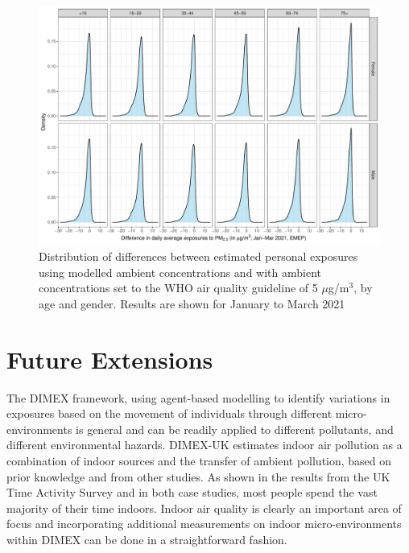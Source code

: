 \documentclass{article}
\begin{document}
\begin{figure}[!hbtp]
	\centering
	\includegraphics[width=0.9\linewidth]{Figures/Fig5b_AgeGr_Sex}		
	\caption{Distribution of differences between estimated personal exposures using modelled ambient concentrations and with ambient concentrations set to the WHO air quality guideline of 5 $\mu$g/m$^{3}$, by age and gender. Results are shown for January to March  2021 } \label{fig::Fig5b_AgeGr_Sex}
\end{figure}

\newpage 

\clearpage
\section{Future Extensions}\label{sec::discussion}


\noindent The DIMEX framework, using agent-based modelling to identify variations in exposures based on the movement of individuals through different micro-environments is general and can be readily applied to different pollutants, and different environmental hazards.  DIMEX-UK estimates indoor air pollution as a combination of indoor sources and the transfer of ambient pollution, based on prior knowledge and from other studies. As shown in the results from the UK Time Activity Survey and in both case studies, most people spend the vast majority of their time indoors. Indoor air quality is clearly an important area of focus and  incorporating  additional measurements on indoor micro-environments within DIMEX can be done in a straightforward fashion. \\
\end{document}
